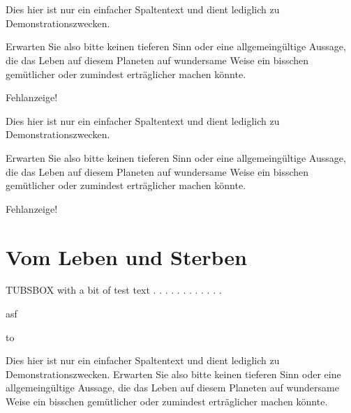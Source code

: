 \documentclass[a4paper,portrait]{scrreprt}
\newcommand{\tubsohead}[1]{\ohead{%
\parbox[t][\headheight]{3cm}{%
\raggedleft #1%
}%
}}%
\begin{document}


\tubsohead{\pagename~\pagemark}
~



\newpage

~
\begin{tubsbox}{0}{1}{1}{8}\footnotesize
  Dies hier ist nur ein einfacher Spaltentext und dient lediglich zu Demonstrationszwecken.
  
  Erwarten Sie also bitte keinen tieferen Sinn oder eine allgemeingültige Aussage, die das Leben auf diesem Planeten auf wundersame Weise ein bisschen gemütlicher oder zumindest erträglicher machen könnte.
  
  Fehlanzeige!
\end{tubsbox}
\begin{tubsbox}{1}{1}{5}{2}
 Dies hier ist nur ein einfacher Spaltentext und dient lediglich zu Demonstrationszwecken.
  
  Erwarten Sie also bitte keinen tieferen Sinn oder eine allgemeingültige Aussage, die das Leben auf diesem Planeten auf wundersame Weise ein bisschen gemütlicher oder zumindest erträglicher machen könnte.
  
  Fehlanzeige!
  \chapter{Vom Leben und Sterben}
  TUBSBOX with a bit of test text . . . . . . . . . . . .
\end{tubsbox}
\begin{tubsbox}[tuBlue20]{1}{3}{5}{2}
asf
\end{tubsbox}

\newpage

\setlength{\fboxsep}{0cm}%
\colorbox{tuSecondaryLight}{%
\parbox{\textwidth}{\vbox to }%
}


\newpage

 Dies hier ist nur ein einfacher Spaltentext und dient lediglich zu Demonstrationszwecken.
  Erwarten Sie also bitte keinen tieferen Sinn oder eine allgemeingültige Aussage, die das Leben auf diesem Planeten auf wundersame Weise ein bisschen gemütlicher oder zumindest erträglicher machen könnte.
  
\end{document}
